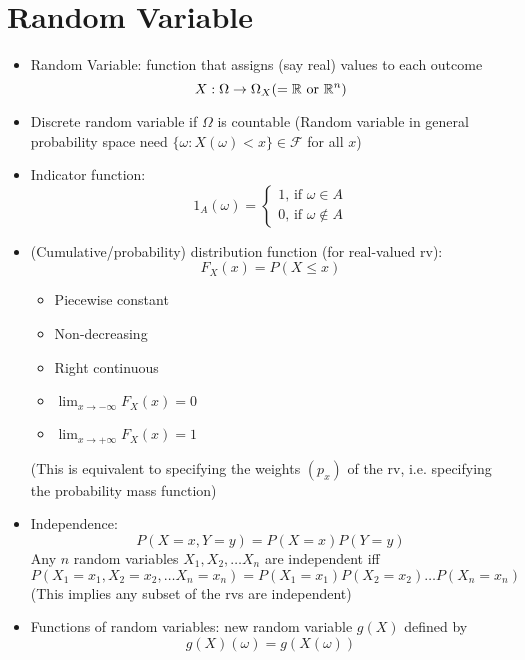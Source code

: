 \section{Random Variable}
\begin{itemize}
      \item Random Variable: function that assigns (say real) values to each outcome
            \[X : \Omega \to \Omega_X (=\mathbb{R} \text{ or } \mathbb{R}^n)\]

      \item Discrete random variable if $\Omega$ is countable
            (Random variable in general probability space need $ \{\omega: X(\omega) <x \} \in \mathcal{F}$ for all $x$)

      \item Indicator function: \[1_A(\omega) = \begin{cases}
                        1 \text{, if } \omega \in A \\
                        0 \text{, if } \omega \notin A
                  \end{cases} \]

      \item (Cumulative/probability) distribution function (for real-valued rv):
            \[F_X(x) = P(X \leq x)\]
            \begin{itemize}
                  \item Piecewise constant
                  \item Non-decreasing
                  \item Right continuous
                  \item $\displaystyle{\lim_{x \to -\infty} F_X(x) = 0 } $
                  \item $\displaystyle{\lim_{x \to +\infty} F_X(x) = 1 } $
            \end{itemize}
            (This is equivalent to specifying the weights $(p_x)$ of the rv, i.e. specifying the probability mass function)

      \item Independence: \[ P(X=x,Y=y) = P(X=x)P(Y=y) \]
            Any $n$ random variables $X_1 , X_2, \dots X_n$ are independent iff
            \[ P(X_1 = x_1, X_2 = x_2,  \dots X_n = x_n) =  P(X_1 = x_1) P(X_2 = x_2) \dots P(X_n = x_n) \] (This implies any subset of the rvs are independent)

      \item Functions of random variables: new random variable $g(X)$ defined by
            \[g(X)(\omega) = g(X(\omega)) \]
\end{itemize}

